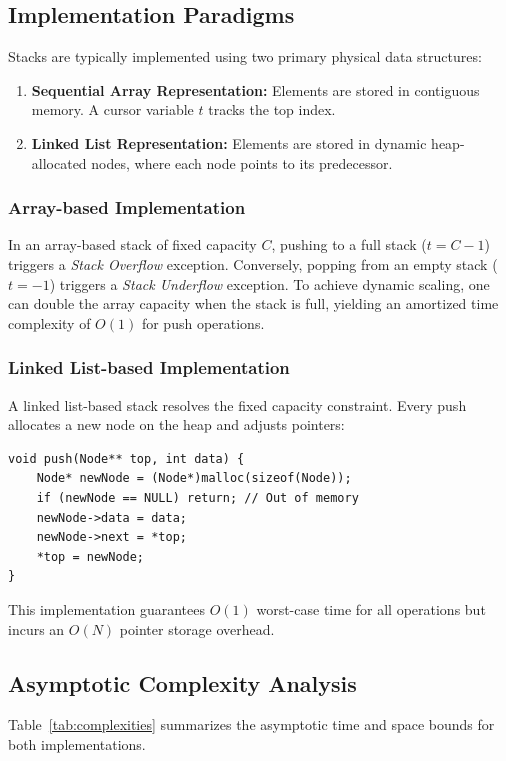 \documentclass[10pt,journal,compsoc,onecolumn]{IEEEtran}
\begin{document}
\subsection{Implementation Paradigms}
Stacks are typically implemented using two primary physical data structures:
\begin{enumerate}
    \item \textbf{Sequential Array Representation:} Elements are stored in contiguous memory. A cursor variable $t$ tracks the top index.
    \item \textbf{Linked List Representation:} Elements are stored in dynamic heap-allocated nodes, where each node points to its predecessor.
\end{enumerate}

\subsubsection{Array-based Implementation}
In an array-based stack of fixed capacity $C$, pushing to a full stack ($t = C-1$) triggers a \textit{Stack Overflow} exception. Conversely, popping from an empty stack ($t = -1$) triggers a \textit{Stack Underflow} exception. To achieve dynamic scaling, one can double the array capacity when the stack is full, yielding an amortized time complexity of $O(1)$ for push operations.

\subsubsection{Linked List-based Implementation}
A linked list-based stack resolves the fixed capacity constraint. Every push allocates a new node on the heap and adjusts pointers:
\begin{verbatim}
void push(Node** top, int data) {
    Node* newNode = (Node*)malloc(sizeof(Node));
    if (newNode == NULL) return; // Out of memory
    newNode->data = data;
    newNode->next = *top;
    *top = newNode;
}
\end{verbatim}
This implementation guarantees $O(1)$ worst-case time for all operations but incurs an $O(N)$ pointer storage overhead.

\subsection{Asymptotic Complexity Analysis}
Table~\ref{tab:complexities} summarizes the asymptotic time and space bounds for both implementations.
\end{document}

